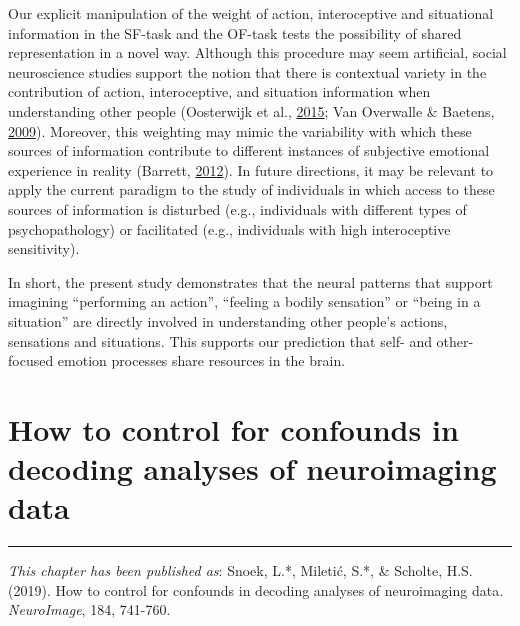 \documentclass[12pt,american,a4paper,oneside,]{memoir} %
\begin{document}
Our explicit manipulation of the weight of action, interoceptive and situational information in the SF-task and the OF-task tests the possibility of shared representation in a novel way. Although this procedure may seem artificial, social neuroscience studies support the notion that there is contextual variety in the contribution of action, interoceptive, and situation information when understanding other people (Oosterwijk et al., \protect\hyperlink{ref-oosterwijk2015concepts}{2015}; Van Overwalle \& Baetens, \protect\hyperlink{ref-van2009understanding}{2009}). Moreover, this weighting may mimic the variability with which these sources of information contribute to different instances of subjective emotional experience in reality (Barrett, \protect\hyperlink{ref-barrett2012emotions}{2012}). In future directions, it may be relevant to apply the current paradigm to the study of individuals in which access to these sources of information is disturbed (e.g., individuals with different types of psychopathology) or facilitated (e.g., individuals with high interoceptive sensitivity).

In short, the present study demonstrates that the neural patterns that support imagining ``performing an action'', ``feeling a bodily sensation'' or ``being in a situation'' are directly involved in understanding other people's actions, sensations and situations. This supports our prediction that self- and other-focused emotion processes share resources in the brain.

\hypertarget{confounds-decoding}{%
\chapter{How to control for confounds in decoding analyses of neuroimaging data}\label{confounds-decoding}}


\vspace*{\fill}

\begin{center}\rule{0.5\linewidth}{0.5pt}\end{center}

\small

\noindent
\emph{This chapter has been published as}: Snoek, L.*, Miletić, S.*, \& Scholte, H.S. (2019). How to control for confounds in decoding analyses of neuroimaging data. \emph{NeuroImage}, 184, 741-760.

\vspace{3mm}
\end{document}
